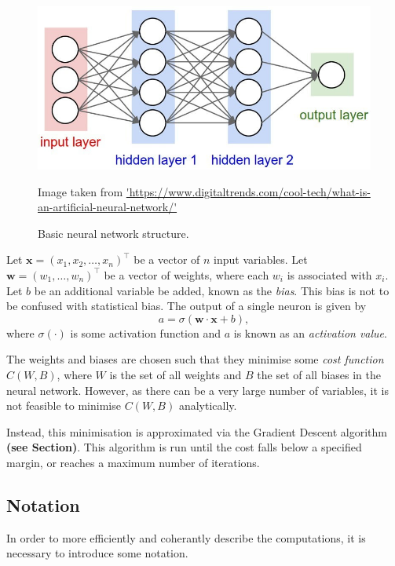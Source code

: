 \begin{figure}[ht]
	\centering
	\includegraphics[width=\textwidth]{Images/3_nnet_structure.jpg}
	\caption{Basic neural network structure.}
	\small Image taken from \url{'https://www.digitaltrends.com/cool-tech/what-is-an-artificial-neural-network/'}
\end{figure}

Let $\mathbf{x} = (x_1, x_2, \ldots, x_n)^\top$ be a vector of $n$ input variables. Let $\mathbf{w} = (w_1, \ldots, w_n)^\top$ be a vector of weights, where each $w_i$ is associated with $x_i$. Let $b$ be an additional variable be added, known as the \textit{bias}. This bias is not to be confused with statistical bias. The output of a single neuron is given by
\[
	a = \sigma(\mathbf{w}\cdot\mathbf{x} + b),
\]
where $\sigma(\cdot)$ is some activation function and $a$ is known as an \textit{activation value}.

The weights and biases are chosen such that they minimise some \textit{cost function} $C(W,B)$, where $W$ is the set of all weights and $B$ the set of all biases in the neural network. However, as there can be a very large number of variables, it is not feasible to minimise $C(W,B)$ analytically.

Instead, this minimisation is approximated via the Gradient Descent algorithm \textbf{(see Section)}. This algorithm is run until the cost falls below a specified margin, or reaches a maximum number of iterations.

\subsection{Notation}\label{nnets-not}

In order to more efficiently and coherantly describe the computations, it is necessary to introduce some notation.

